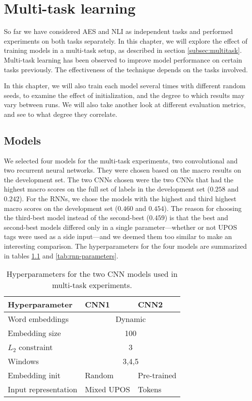 \chapter{Multi-task learning} \label{ch:multitask}

So far we have considered \ac{AES} and \ac{NLI} as independent tasks and
performed experiments on both tasks separately. In this chapter, we will
explore the effect of training models in a multi-task setup, as described in
section \ref{subsec:multitask}. Multi-task learning has been observed to
improve model performance on certain tasks previously. The effectiveness of
the technique depends on the tasks involved.

In this chapter, we will also train each model several times with different
random seeds, to examine the effect of initialization, and the degree to
which results may vary between runs. We will also take another look at
different evaluation metrics, and see to what degree they correlate.


\section{Models}

We selected four models for the multi-task experiments, two convolutional and
two recurrent neural networks. They were chosen based on the macro \FI
results on the development set. The two \acp{CNN} chosen were the two
\acp{CNN} that had the highest macro \FI scores on the full set of labels in
the development set ($0.258$ and $0.242$). For the \acp{RNN}, we chose the
models with the highest and third highest macro \FI scores on the development
set ($0.460$ and $0.454$). The reason for choosing the third-best model
instead of the second-best ($0.459$) is that the best and second-best models
differed only in a single parameter---whether or not UPOS tags were used as a
side input---and we deemed them too similar to make an interesting
comparison. The hyperparameters for the four models are summarized in tables
\ref{tab:cnn-parameters} and \ref{tab:rnn-parameters}.

\begin{table}
  \centering
  \begin{tabular}{lll}
    \toprule
    Hyperparameter       & CNN1 & CNN2 \\
    \midrule
    Word embeddings      & \multicolumn{2}{c}{Dynamic} \\
    Embedding size       & \multicolumn{2}{c}{100} \\
    $L_2$ constraint     & \multicolumn{2}{c}{3} \\
    Windows              & \multicolumn{2}{c}{3,4,5} \\
    Embedding init       & Random & Pre-trained \\
    Input representation & Mixed UPOS & Tokens \\
    \bottomrule
  \end{tabular}
  \caption[Descriptions of the two CNN models]{
    Hyperparameters for the two CNN models used in multi-task experiments.
  }
  \label{tab:cnn-parameters}
\end{table}

